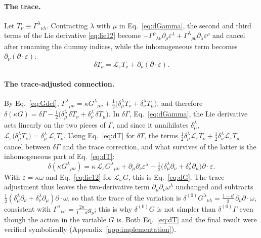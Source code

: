 \documentclass[prd,aps,preprint,superscriptaddress,nofootinbib,amsmath,amssymb,eqsecnum]{revtex4-2}
\begin{document}
\paragraph{The trace.} Let $T_\nu\equiv\Gamma^{\lambda}{}_{\nu\lambda}$. Contracting
$\lambda$ with $\mu$ in Eq.~\eqref{eq:dGamma}, the second and third terms of the Lie derivative
\eqref{eq:lie12} become $-\Gamma^{\rho}{}_{\lambda\nu}\partial_\rho\varepsilon^\lambda
+\Gamma^{\lambda}{}_{\rho\nu}\partial_\lambda\varepsilon^\rho$ and cancel after renaming the
dummy indices, while the inhomogeneous term becomes $\partial_\nu(\partial\!\cdot\!\varepsilon)$:
\begin{equation}
\delta T_\nu=\mathcal{L}_\varepsilon T_\nu+\partial_\nu(\partial\!\cdot\!\varepsilon).
\label{eq:dT}
\end{equation}

\paragraph{The trace-adjusted connection.} By Eq.~\eqref{eq:Gdef},
$\Gamma^{\lambda}{}_{\mu\nu}=\kappa G^{\lambda}{}_{\mu\nu}
+\tfrac12\big(\delta^\lambda_\mu T_\nu+\delta^\lambda_\nu T_\mu\big)$, and therefore
$\delta(\kappa G)=\delta\Gamma-\tfrac12\big(\delta^\lambda_\mu\,\delta T_\nu+\delta^\lambda_\nu\,\delta T_\mu\big)$.
In $\delta\Gamma$, Eq.~\eqref{eq:dGamma}, the Lie derivative acts linearly on the two pieces of
$\Gamma$, and since it annihilates $\delta^\lambda_\mu$,
$\mathcal{L}_\varepsilon\big(\delta^\lambda_\mu T_\nu\big)=\delta^\lambda_\mu\,\mathcal{L}_\varepsilon T_\nu$.
Using Eq.~\eqref{eq:dT} for $\delta T$, the terms $\tfrac12\delta^\lambda_\mu\mathcal{L}_\varepsilon T_\nu
+\tfrac12\delta^\lambda_\nu\mathcal{L}_\varepsilon T_\mu$ cancel between $\delta\Gamma$ and
the trace correction, and what survives of the latter is the inhomogeneous part of
Eq.~\eqref{eq:dT}:
\begin{equation}
\delta(\kappa G^{\lambda}{}_{\mu\nu})=\kappa\,\mathcal{L}_\varepsilon G^{\lambda}{}_{\mu\nu}
+\partial_\mu\partial_\nu\varepsilon^\lambda
-\tfrac12\big(\delta^\lambda_\mu\partial_\nu+\delta^\lambda_\nu\partial_\mu\big)\partial\!\cdot\!\varepsilon .
\end{equation}
With $\varepsilon=\kappa\omega$ and Eq.~\eqref{eq:lie12} for $\mathcal{L}_\omega G$, this is
Eq.~\eqref{eq:dG}. The trace adjustment thus leaves the two-derivative term
$\partial_\mu\partial_\nu\omega^\lambda$ unchanged and subtracts
$\tfrac12(\delta^\lambda_\mu\partial_\nu+\delta^\lambda_\nu\partial_\mu)\partial\!\cdot\!\omega$,
so that the trace of the variation is
$\delta^{(0)}G^{\lambda}{}_{\nu\lambda}=\tfrac{1-d}{2}\,\partial_\nu\partial\!\cdot\!\omega$,
consistent with $\Gamma^{\sigma}{}_{\nu\sigma}=\frac{2\kappa}{1-d}g_\nu$; this is why
$\delta^{(0)}G$ is not simpler than $\delta^{(0)}\Gamma$ even though the action in the
variable $G$ is. Both Eq.~\eqref{eq:dT} and the final result were verified symbolically
(Appendix~\ref{app:implementation}).
\end{document}
